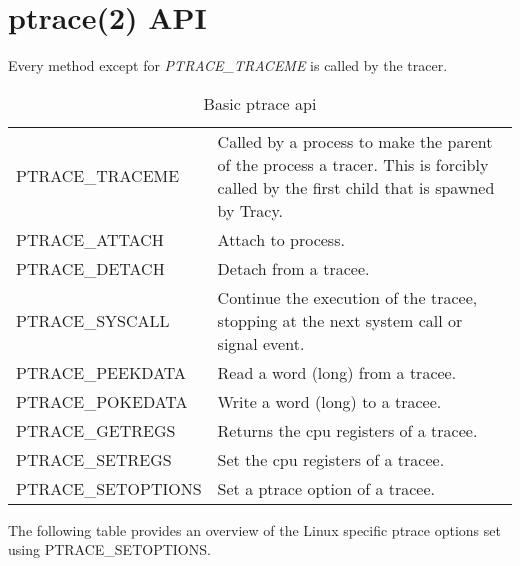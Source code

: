\documentclass[a4paper, 10pt]{report}
\begin{document}
\chapter{ptrace(2) API}
\label{ptrace-api}

Every method except for \textit{PTRACE\_TRACEME} is called by the tracer.
\begin{table}[h!]
    \centering
    \begin{tabular}{|l|p{8cm}|}
    \hline
        PTRACE\_TRACEME & Called by a process to make the parent of the process
        a tracer. This is forcibly called by the first child that is
        spawned by Tracy. \\
        PTRACE\_ATTACH & Attach to process. \\
        PTRACE\_DETACH & Detach from a tracee. \\
        PTRACE\_SYSCALL & Continue the execution of the tracee,
        stopping at the next system call or signal event. \\
        PTRACE\_PEEKDATA & Read a word (long) from a tracee. \\
        PTRACE\_POKEDATA & Write a word (long) to a tracee. \\
        PTRACE\_GETREGS & Returns the cpu registers of a tracee. \\
        PTRACE\_SETREGS & Set the cpu registers of a tracee. \\
        PTRACE\_SETOPTIONS & Set a ptrace option of a tracee. \\
    \hline
    \end{tabular}
    \caption{Basic ptrace api}
    \label{tab:ptrace-api}
\end{table}

\newpage

The following table provides an overview of the Linux specific ptrace
options set using PTRACE\_SETOPTIONS.
\end{document}
